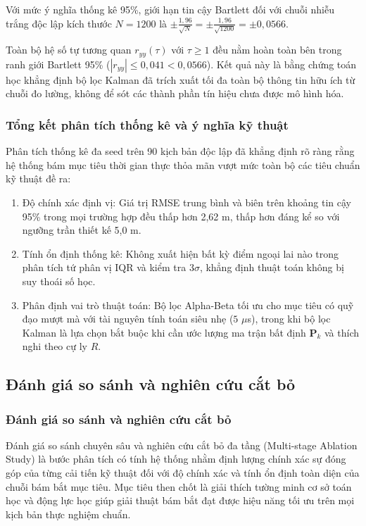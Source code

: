 Với mức ý nghĩa thống kê 95\%, giới hạn tin cậy Bartlett đối với chuỗi nhiễu trắng độc lập kích thước $N = 1200$ là $\pm \frac{1{,}96}{\sqrt{N}} = \pm \frac{1{,}96}{\sqrt{1200}} = \pm 0{,}0566$. 

Toàn bộ hệ số tự tương quan $r_{yy}(\tau)$ với $\tau \ge 1$ đều nằm hoàn toàn bên trong ranh giới Bartlett 95\% ($|r_{yy}| \le 0{,}041 < 0{,}0566$). Kết quả này là bằng chứng toán học khẳng định bộ lọc Kalman đã trích xuất tối đa toàn bộ thông tin hữu ích từ chuỗi đo lường, không để sót các thành phần tín hiệu chưa được mô hình hóa.



\subsubsection{Tổng kết phân tích thống kê và ý nghĩa kỹ thuật}

\hspace{0.5cm} Phân tích thống kê đa seed trên 90 kịch bản độc lập đã khẳng định rõ ràng rằng hệ thống bám mục tiêu thời gian thực thỏa mãn vượt mức toàn bộ các tiêu chuẩn kỹ thuật đề ra:
\begin{enumerate}
    \item Độ chính xác định vị: Giá trị RMSE trung bình và biên trên khoảng tin cậy 95\% trong mọi trường hợp đều thấp hơn 2,62 m, thấp hơn đáng kể so với ngưỡng trần thiết kế 5,0 m.
    \item Tính ổn định thống kê: Không xuất hiện bất kỳ điểm ngoại lai nào trong phân tích tứ phân vị IQR và kiểm tra $3\sigma$, khẳng định thuật toán không bị suy thoái số học.
    \item Phân định vai trò thuật toán: Bộ lọc Alpha-Beta tối ưu cho mục tiêu có quỹ đạo mượt mà với tài nguyên tính toán siêu nhẹ ($5$ $\mu$s), trong khi bộ lọc Kalman là lựa chọn bắt buộc khi cần ước lượng ma trận bất định $\mathbf{P}_k$ và thích nghi theo cự ly $R$.
\end{enumerate}

\subsection{Đánh giá so sánh và nghiên cứu cắt bỏ}

\subsubsection{Đánh giá so sánh và nghiên cứu cắt bỏ}

\hspace{0.5cm} Đánh giá so sánh chuyên sâu và nghiên cứu cắt bỏ đa tầng (Multi-stage Ablation Study) là bước phân tích có tính hệ thống nhằm định lượng chính xác sự đóng góp của từng cải tiến kỹ thuật đối với độ chính xác và tính ổn định toàn diện của chuỗi bám bắt mục tiêu. Mục tiêu then chốt là giải thích tường minh cơ sở toán học và động lực học giúp giải thuật bám bắt đạt được hiệu năng tối ưu trên mọi kịch bản thực nghiệm chuẩn.

